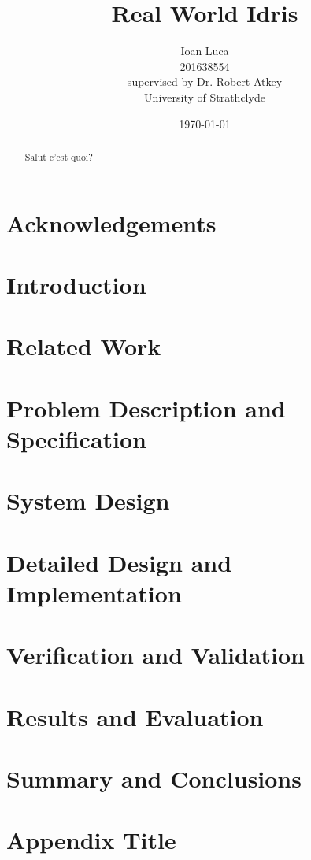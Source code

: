 \documentclass[a4paper, 12pt, oneside]{report}
\title{Real World Idris}
\author{Ioan Luca \\ 201638554 \\ \small supervised by Dr. Robert Atkey \\
	\small University of Strathclyde} %
\date{\today}
\begin{document}
\maketitle


\listoffigures
\listoftables

\chapter*{Acknowledgements}

\begin{abstract}
    Salut c'est quoi?
\end{abstract}

\tableofcontents


\chapter{Introduction}
\label{ch:intro}


\chapter{Related Work}
\label{ch:techintro}

\chapter{Problem Description and Specification}
\label{ch:method}

\chapter{System Design}
\label{ch:results}

\chapter{Detailed Design and Implementation}
\label{ch:conc}

\chapter{Verification and Validation}

\chapter{Results and Evaluation}

\chapter{Summary and Conclusions}

\appendix
\chapter{Appendix Title}




\end{document}
